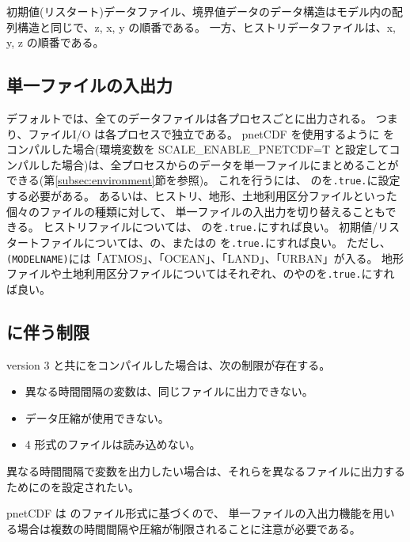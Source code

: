 初期値(リスタート)データファイル、境界値データのデータ構造はモデル内の配列構造と同じで、z, x, y の順番である。
一方、ヒストリデータファイルは、x, y, z の順番である。

\subsection{単一ファイルの入出力} \label{subsec:single_io}
デフォルトでは、全てのデータファイルは各プロセスごとに出力される。
つまり、ファイルI/O は各プロセスで独立である。
pnetCDF を使用するように \scalerm をコンパルした場合(環境変数を SCALE\_ENABLE\_PNETCDF=T と設定してコンパルした場合)は、全プロセスからのデータを単一ファイルにまとめることができる(第\ref{subsec:environment}節を参照)。
これを行うには、 のを\verb|.true.|に設定する必要がある。
あるいは、ヒストリ、地形、土地利用区分ファイルといった個々のファイルの種類に対して、
単一ファイルの入出力を切り替えることもできる。
ヒストリファイルについては、 のを\verb|.true.|にすれば良い。
初期値/リスタートファイルについては、の、またはの
を\verb|.true.|にすれば良い。
ただし、\verb|(MODELNAME)|には「ATMOS」、「OCEAN」、「LAND」、「URBAN」が入る。
地形ファイルや土地利用区分ファイルについてはそれぞれ、のやのを\verb|.true.|にすれば良い。

\subsection{ に伴う制限}
{\netcdf} version 3 と共に\scale をコンパイルした場合は、次の制限が存在する。
\begin{itemize}
\item 異なる時間間隔の変数は、同じファイルに出力できない。
\item データ圧縮が使用できない。
\item {\netcdf}4 形式のファイルは読み込めない。
\end{itemize}
異なる時間間隔で変数を出力したい場合は、それらを異なるファイルに出力するためにのを設定されたい。

pnetCDF は  のファイル形式に基づくので、
単一ファイルの入出力機能を用いる場合は複数の時間間隔や圧縮が制限されることに注意が必要である。

